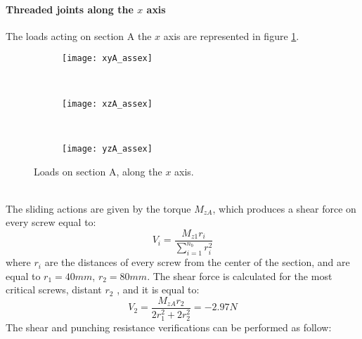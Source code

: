 \paragraph{Threaded joints along the $x$ axis} The loads acting on section A the $x$ axis are represented in figure \ref{fig:sectionxA}.\\
\begin{figure}[h!]
    \centering
    \begin{subfigure}{0.32\linewidth}
    	\centering \texttt{[image: xyA\_assex]} 
	\end{subfigure}\\
	\begin{subfigure}{0.32\linewidth}
		\centering \texttt{[image: xzA\_assex]}
	\end{subfigure}\\
	\begin{subfigure}{0.32\linewidth}
		\centering \texttt{[image: yzA\_assex]} 
	\end{subfigure}    
    \caption{Loads on section A, along the $x$ axis.}
    \label{fig:sectionxA}
\end{figure}\\
The sliding actions are given by the torque $M_{zA}$, which produces a shear force on every screw equal to:\\
\begin{equation*}
    V_{i} = \frac{M_{z1}r_{i}}{\sum\limits_{i=1}^{n_{{b}}} r^2_{i}}
\end{equation*}
where $r_{i}$ are the distances of every screw from the center of the section, and are equal to $r_{1} = 40 mm$, $r_{2} = 80 mm$. 
The shear force is calculated for the most critical screws, distant $r_{2}$ , and it is equal to:\\
\begin{equation*}
    V_{2} = \frac{M_{zA}r_{2}}{2r^2_{1}+2r^2_{2}} = - 2.97 N
\end{equation*}
The shear and punching resistance verifications can be performed as follow:
